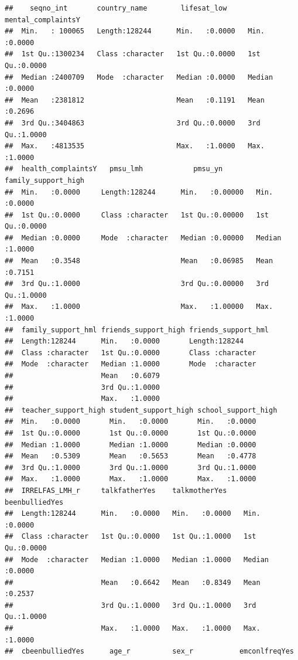 \documentclass[
]{article}
\begin{document}
\begin{verbatim}
##    seqno_int       country_name        lifesat_low     mental_complaintsY
##  Min.   : 100065   Length:128244      Min.   :0.0000   Min.   :0.0000    
##  1st Qu.:1300234   Class :character   1st Qu.:0.0000   1st Qu.:0.0000    
##  Median :2400709   Mode  :character   Median :0.0000   Median :0.0000    
##  Mean   :2381812                      Mean   :0.1191   Mean   :0.2696    
##  3rd Qu.:3404863                      3rd Qu.:0.0000   3rd Qu.:1.0000    
##  Max.   :4813535                      Max.   :1.0000   Max.   :1.0000    
##  health_complaintsY   pmsu_lmh            pmsu_yn        family_support_high
##  Min.   :0.0000     Length:128244      Min.   :0.00000   Min.   :0.0000     
##  1st Qu.:0.0000     Class :character   1st Qu.:0.00000   1st Qu.:0.0000     
##  Median :0.0000     Mode  :character   Median :0.00000   Median :1.0000     
##  Mean   :0.3548                        Mean   :0.06985   Mean   :0.7151     
##  3rd Qu.:1.0000                        3rd Qu.:0.00000   3rd Qu.:1.0000     
##  Max.   :1.0000                        Max.   :1.00000   Max.   :1.0000     
##  family_support_hml friends_support_high friends_support_hml
##  Length:128244      Min.   :0.0000       Length:128244      
##  Class :character   1st Qu.:0.0000       Class :character   
##  Mode  :character   Median :1.0000       Mode  :character   
##                     Mean   :0.6079                          
##                     3rd Qu.:1.0000                          
##                     Max.   :1.0000                          
##  teacher_support_high student_support_high school_support_high
##  Min.   :0.0000       Min.   :0.0000       Min.   :0.0000     
##  1st Qu.:0.0000       1st Qu.:0.0000       1st Qu.:0.0000     
##  Median :1.0000       Median :1.0000       Median :0.0000     
##  Mean   :0.5309       Mean   :0.5653       Mean   :0.4778     
##  3rd Qu.:1.0000       3rd Qu.:1.0000       3rd Qu.:1.0000     
##  Max.   :1.0000       Max.   :1.0000       Max.   :1.0000     
##  IRRELFAS_LMH_r     talkfatherYes    talkmotherYes    beenbulliedYes  
##  Length:128244      Min.   :0.0000   Min.   :0.0000   Min.   :0.0000  
##  Class :character   1st Qu.:0.0000   1st Qu.:1.0000   1st Qu.:0.0000  
##  Mode  :character   Median :1.0000   Median :1.0000   Median :0.0000  
##                     Mean   :0.6642   Mean   :0.8349   Mean   :0.2537  
##                     3rd Qu.:1.0000   3rd Qu.:1.0000   3rd Qu.:1.0000  
##                     Max.   :1.0000   Max.   :1.0000   Max.   :1.0000  
##  cbeenbulliedYes      age_r          sex_r           emconlfreqYes   

\end{verbatim}
\end{document}
